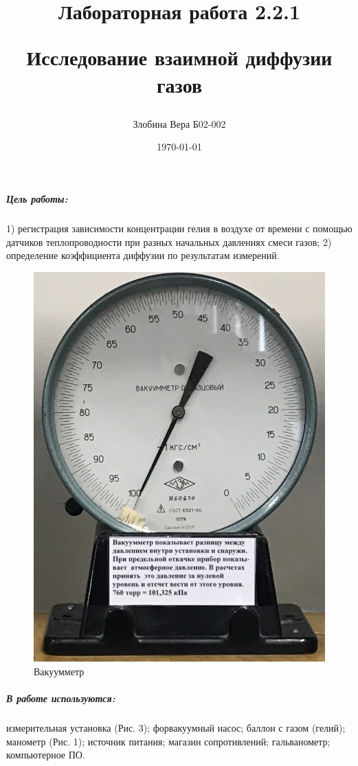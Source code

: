 \documentclass[a4paper,12pt]{article}
\author{Злобина Вера Б02-002}
\title{Лабораторная работа 2.2.1

Исследование взаимной диффузии газов}
\date{\today}
\begin{document}
	
\maketitle 
	
	
\newpage


\subparagraph*{Цель работы:}1)  регистрация  зависимости  концентрации   гелия в воздухе от времени с помощью датчиков теплопроводности при разных начальных давлениях смеси газов; 2) определение коэффициента диффузии по результатам измерений.

\begin{figure} 
	\centering 
	\includegraphics[scale=0.055]{vac.jpg} 
	\caption{Вакуумметр} 
\end{figure}

\subparagraph*{В работе используются:}измерительная установка (Рис. 3); форвакуумный насос; баллон с газом (гелий); манометр (Рис. 1); источник питания; магазин сопротивлений; гальванометр;  компьютерное ПО.
\end{document}
